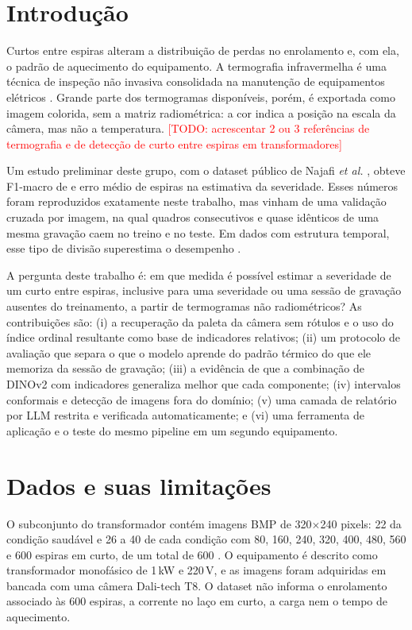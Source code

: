 \documentclass[11pt,a4paper]{article}
\newcommand{\todo}[1]{\textcolor{red}{[TODO: #1]}}
\begin{document}
\section{Introdução}

Curtos entre espiras alteram a distribuição de perdas no enrolamento e, com ela, o padrão de aquecimento do equipamento. A termografia infravermelha é uma técnica de inspeção não invasiva consolidada na manutenção de equipamentos elétricos \cite{bagavathiappan2013}. Grande parte dos termogramas disponíveis, porém, é exportada como imagem colorida, sem a matriz radiométrica: a cor indica a posição na escala da câmera, mas não a temperatura. \todo{acrescentar 2 ou 3 referências de termografia e de detecção de curto entre espiras em transformadores}

Um estudo preliminar deste grupo, com o dataset público de Najafi \textit{et al.} \cite{najafi2020trafo}, obteve F1-macro de \FUmOriginal{} e erro médio de \MAEOriginal{} espiras na estimativa da severidade. Esses números foram reproduzidos exatamente neste trabalho, mas vinham de uma validação cruzada por imagem, na qual quadros consecutivos e quase idênticos de uma mesma gravação caem no treino e no teste. Em dados com estrutura temporal, esse tipo de divisão superestima o desempenho \cite{roberts2017cv}.

A pergunta deste trabalho é: em que medida é possível estimar a severidade de um curto entre espiras, inclusive para uma severidade ou uma sessão de gravação ausentes do treinamento, a partir de termogramas não radiométricos? As contribuições são:
(i) a recuperação da paleta da câmera sem rótulos e o uso do índice ordinal resultante como base de indicadores relativos;
(ii) um protocolo de avaliação que separa o que o modelo aprende do padrão térmico do que ele memoriza da sessão de gravação;
(iii) a evidência de que a combinação de DINOv2 com indicadores generaliza melhor que cada componente;
(iv) intervalos conformais e detecção de imagens fora do domínio;
(v) uma camada de relatório por LLM restrita e verificada automaticamente; e
(vi) uma ferramenta de aplicação e o teste do mesmo pipeline em um segundo equipamento.

\section{Dados e suas limitações}

O subconjunto do transformador contém \NImagens{} imagens BMP de 320$\times$240 pixels: 22 da condição saudável e 26 a 40 de cada condição com 80, 160, 240, 320, 400, 480, 560 e 600 espiras em curto, de um total de 600 \cite{najafi2020trafo}. O equipamento é descrito como transformador monofásico de 1\,kW e 220\,V, e as imagens foram adquiridas em bancada com uma câmera Dali-tech T8. O dataset não informa o enrolamento associado às 600 espiras, a corrente no laço em curto, a carga nem o tempo de aquecimento.
\end{document}

